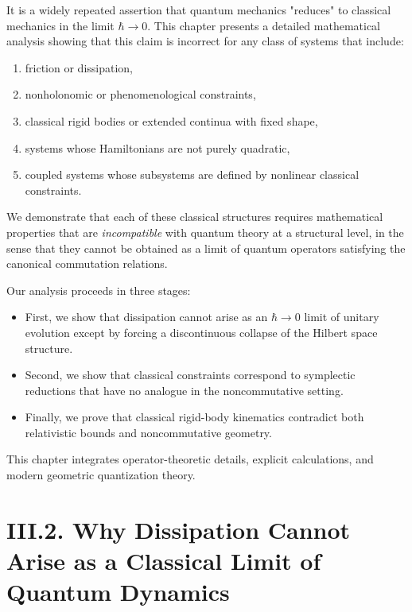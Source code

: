 \documentclass[12pt,oneside]{book}
\theoremstyle{plain}
\theoremstyle{definition}
\begin{document}
It is a widely repeated assertion that quantum mechanics "reduces" to classical
mechanics in the limit $\hbar\to 0$. This chapter presents a detailed
mathematical analysis showing that this claim is incorrect for any class of
systems that include:

\begin{enumerate}
    \item friction or dissipation,
    \item nonholonomic or phenomenological constraints,
    \item classical rigid bodies or extended continua with fixed shape,
    \item systems whose Hamiltonians are not purely quadratic,
    \item coupled systems whose subsystems are defined by nonlinear classical
          constraints.
\end{enumerate}

We demonstrate that each of these classical structures requires mathematical
properties that are \emph{incompatible} with quantum theory at a structural
level, in the sense that they cannot be obtained as a limit of quantum
operators satisfying the canonical commutation relations.

Our analysis proceeds in three stages:

\begin{itemize}
    \item First, we show that dissipation cannot arise as an $\hbar \to 0$
    limit of unitary evolution except by forcing a discontinuous collapse of
    the Hilbert space structure.

    \item Second, we show that classical constraints correspond to symplectic
    reductions that have no analogue in the noncommutative setting.

    \item Finally, we prove that classical rigid-body kinematics contradict
    both relativistic bounds and noncommutative geometry.
\end{itemize}

This chapter integrates operator-theoretic details, explicit calculations, and
modern geometric quantization theory.


\section{III.2. Why Dissipation Cannot Arise as a Classical Limit of Quantum Dynamics}
\end{document}
